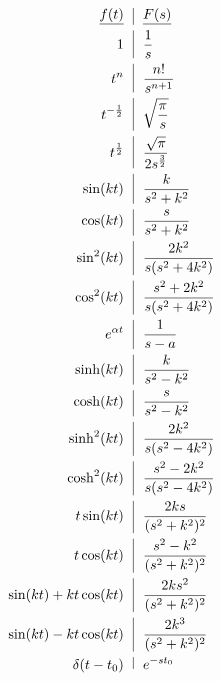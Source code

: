 \begin{multicols}{2}

\begin{equation*}
  \begin{split}
    \underline{f(t)}\,\,\,\,&\vline\,\,\,\,\underline{F(s)}\\
      1\,\,\,\,&\vline\,\,\,\,\frac{1}{s}\\
      t^n\,\,\,\,&\vline\,\,\,\,\frac{n!}{s^{n+1}}\\
      t^{-\frac{1}{2}}\,\,\,\,&\vline\,\,\,\,\sqrt{\frac{\pi}{s}}\\
      t^{\frac{1}{2}}\,\,\,\,&\vline\,\,\,\,\frac{\sqrt{\pi}}{2s^{\frac{3}{2}}}\\
      \sin (kt)\,\,\,\,&\vline\,\,\,\,\frac{k}{s^2+k^2}\\
      \cos (kt)\,\,\,\,&\vline\,\,\,\,\frac{s}{s^2+k^2}\\
      \sin^2(kt)\,\,\,\,&\vline\,\,\,\,\frac{2k^2}{s(s^2+4k^2)}\\
      \cos^2(kt)\,\,\,\,&\vline\,\,\,\,\frac{s^2+2k^2}{s(s^2+4k^2)}\\
      e^{\alpha t}\,\,\,\,&\vline\,\,\,\,\frac{1}{s-a}\\
    \sinh (kt)\,\,\,\,&\vline\,\,\,\,\frac{k}{s^2-k^2}\\
    \cosh (kt)\,\,\,\,&\vline\,\,\,\,\frac{s}{s^2-k^2}\\
      \sinh^2 (kt)\,\,\,\,&\vline\,\,\,\,\frac{2k^2}{s(s^2-4k^2)}\\
      \cosh^2 (kt)\,\,\,\,&\vline\,\,\,\,\frac{s^2-2k^2}{s(s^2-4k^2)}\\
    t\sin(kt)\,\,\,\,&\vline\,\,\,\,\frac{2ks}{(s^2+k^2)^2}\\
    t\cos(kt)\,\,\,\,&\vline\,\,\,\,\frac{s^2-k^2}{(s^2+k^2)^2}\\
    \sin(kt)+kt\cos(kt)\,\,\,\,&\vline\,\,\,\,\frac{2ks^2}{(s^2+k^2)^2}\\
    \sin(kt)-kt\cos(kt)\,\,\,\,&\vline\,\,\,\,\frac{2k^3}{(s^2+k^2)^2}\\
    \delta(t-t_0)\,\,\,\,&\vline\,\,\,\,e^{-st_0}
  \end{split}
  \label{1}
  \end{equation*}
    

\end{multicols}
